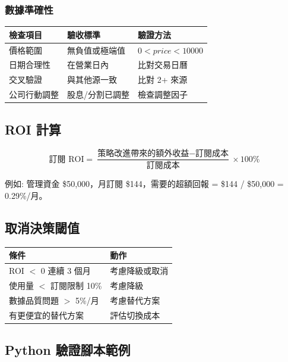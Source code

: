 \documentclass[11pt,a4paper]{article}
\begin{document}
\subsubsection*{數據準確性}

\begin{table}[H]
\centering
\begin{tabular}{@{}lll@{}}
\toprule
\textbf{檢查項目} & \textbf{驗收標準} & \textbf{驗證方法} \\
\midrule
價格範圍 & 無負值或極端值 & $0 < price < 10000$ \\
日期合理性 & 在營業日內 & 比對交易日曆 \\
交叉驗證 & 與其他源一致 & 比對 2+ 來源 \\
公司行動調整 & 股息/分割已調整 & 檢查調整因子 \\
\bottomrule
\end{tabular}
\end{table}

\subsection*{ROI 計算}

\begin{equation*}
\text{訂閱 ROI} = \frac{\text{策略改進帶來的額外收益} - \text{訂閱成本}}{\text{訂閱成本}} \times 100\%
\end{equation*}

例如: 管理資金 \$50,000，月訂閱 \$144，需要的超額回報 = \$144 / \$50,000 = 0.29\%/月。

\subsection*{取消決策閾值}

\begin{table}[H]
\centering
\begin{tabular}{@{}ll@{}}
\toprule
\textbf{條件} & \textbf{動作} \\
\midrule
ROI $<$ 0 連續 3 個月 & 考慮降級或取消 \\
使用量 $<$ 訂閱限制 10\% & 考慮降級 \\
數據品質問題 $>$ 5\%/月 & 考慮替代方案 \\
有更便宜的替代方案 & 評估切換成本 \\
\bottomrule
\end{tabular}
\end{table}

\subsection*{Python 驗證腳本範例}
\end{document}
